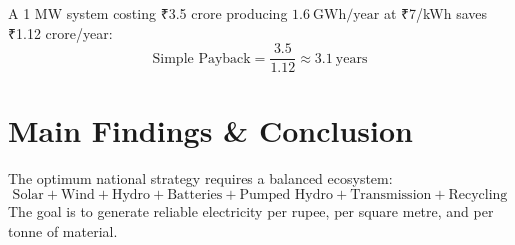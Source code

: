 \documentclass[11pt,a4paper]{article}
\begin{document}
A 1 MW system costing ₹3.5 crore producing $1.6\ \text{GWh/year}$ at ₹7/kWh saves ₹1.12 crore/year:
\[
\text{Simple Payback} = \frac{3.5}{1.12} \approx \boxed{3.1\ \text{years}}
\]

\section{Main Findings \& Conclusion}

The optimum national strategy requires a balanced ecosystem:
\[
\boxed{\text{Solar} + \text{Wind} + \text{Hydro} + \text{Batteries} + \text{Pumped Hydro} + \text{Transmission} + \text{Recycling}}
\]
The goal is to generate reliable electricity per rupee, per square metre, and per tonne of material.
\end{document}

